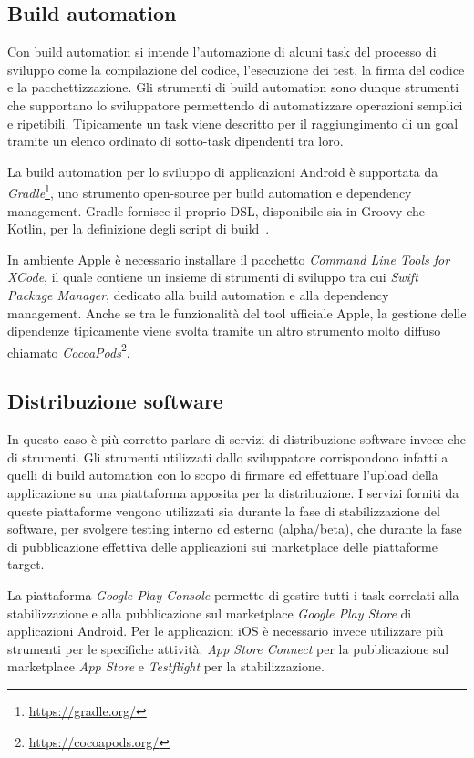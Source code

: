 \subsection*{Build automation}
Con build automation si intende l'automazione di alcuni task del processo di sviluppo come la compilazione del codice, l'esecuzione dei test, la firma del codice e la pacchettizzazione. Gli strumenti di build automation sono dunque strumenti che supportano lo sviluppatore permettendo di automatizzare operazioni semplici e ripetibili. Tipicamente un task viene descritto per il raggiungimento di un goal tramite un elenco ordinato di sotto-task dipendenti tra loro.

La build automation per lo sviluppo di applicazioni Android è supportata da \textit{Gradle}\footnote{\href{https://gradle.org/}{https://gradle.org/}}, uno strumento open-source per build automation e dependency management. Gradle fornisce il proprio DSL, disponibile sia in Groovy che Kotlin, per la definizione degli script di build~\cite{nagy2022simplifying}.

In ambiente Apple è necessario installare il pacchetto \textit{Command Line Tools for XCode}, il quale contiene un insieme di strumenti di sviluppo tra cui \textit{Swift Package Manager}, dedicato alla build automation e alla dependency management. Anche se tra le funzionalità del tool ufficiale Apple, la gestione delle dipendenze tipicamente viene svolta tramite un altro strumento molto diffuso chiamato \textit{CocoaPods}\footnote{\href{https://cocoapods.org/}{https://cocoapods.org/}}.

\subsection*{Distribuzione software}
In questo caso è più corretto parlare di servizi di distribuzione software invece che di strumenti. Gli strumenti utilizzati dallo sviluppatore corrispondono infatti a quelli di build automation con lo scopo di firmare ed effettuare l'upload della applicazione su una piattaforma apposita per la distribuzione. I servizi forniti da queste piattaforme vengono utilizzati sia durante la fase di stabilizzazione del software, per svolgere testing interno ed esterno (alpha/beta), che durante la fase di pubblicazione effettiva delle applicazioni sui marketplace delle piattaforme target.

La piattaforma \textit{Google Play Console} permette di gestire tutti i task correlati alla stabilizzazione e alla pubblicazione sul marketplace \textit{Google Play Store} di applicazioni Android. Per le applicazioni iOS è necessario invece utilizzare più strumenti per le specifiche attività: \textit{App Store Connect} per la pubblicazione sul marketplace \textit{App Store} e \textit{Testflight} per la stabilizzazione.

